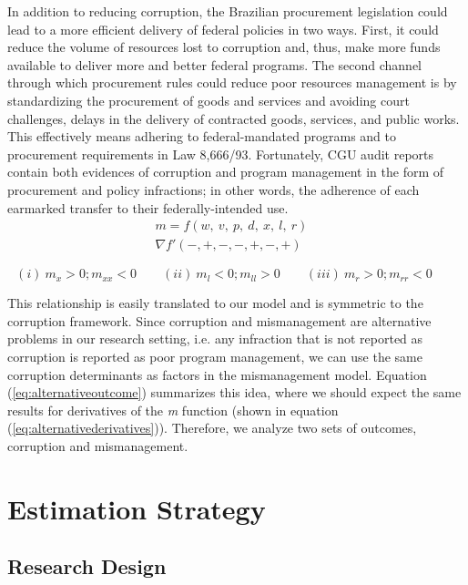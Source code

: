 \documentclass[11pt]{article}
\begin{document}
In addition to reducing corruption, the Brazilian procurement legislation could lead to a more efficient delivery of federal policies in two ways. First, it could reduce the volume of resources lost to corruption and, thus, make more funds available to deliver more and better federal programs. The second channel through which procurement rules could reduce poor resources management is by standardizing the procurement of goods and services and avoiding court challenges, delays in the delivery of contracted goods, services, and public works. This effectively means adhering to federal-mandated programs and to procurement requirements in Law 8,666/93. Fortunately, CGU audit reports contain both evidences of corruption and program management in the form of procurement and policy infractions; in other words, the adherence of each earmarked transfer to their federally-intended use.
\begin{equation} \label{eq:alternativeoutcome}
  \begin{aligned}
    m = f(w,\ v,\ p,\ d,\ x,\ l,\ r)& \\
    \nabla f'(-,+,-,-,+,-,+)&
  \end{aligned}
\end{equation}

\begin{equation} \label{eq:alternativederivatives}
  (i) \   m_{x} > 0; m_{xx} < 0 \qquad
  (ii) \  m_{l} < 0; m_{ll} > 0 \qquad
  (iii) \ m_{r} > 0; m_{rr} < 0 \qquad
\end{equation}

This relationship is easily translated to our model and is symmetric to the corruption framework. Since corruption and mismanagement are alternative problems in our research setting, i.e. any infraction that is not reported as corruption is reported as poor program management, we can use the same corruption determinants as factors in the mismanagement model. Equation (\ref{eq:alternativeoutcome}) summarizes this idea, where we should expect the same results for derivatives of the \emph{m} function (shown in equation (\ref{eq:alternativederivatives})). Therefore, we analyze two sets of outcomes, corruption and mismanagement.

\section{Estimation Strategy} \label{sec:methodology}

\subsection{Research Design} \label{subsec:methodology}
\end{document}
